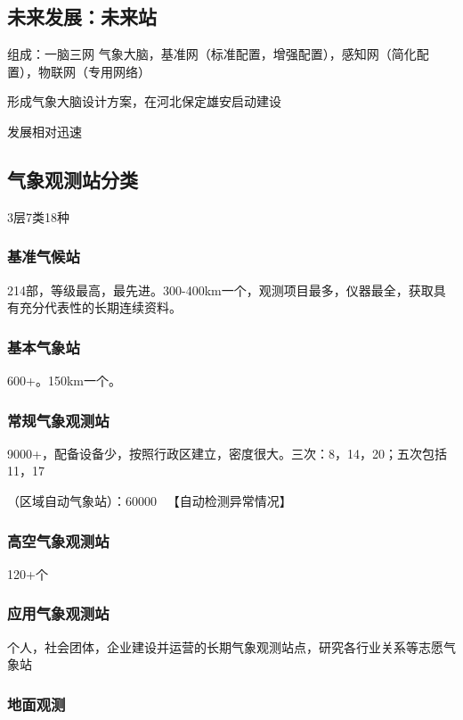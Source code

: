 ﻿\documentclass[UTF8,11pt]{ctexbook}%
\begin{document}
\subsection{未来发展：未来站}

组成：一脑三网 气象大脑，基准网（标准配置，增强配置），感知网（简化配置），物联网（专用网络）

形成气象大脑设计方案，在河北保定雄安启动建设

发展相对迅速

\subsection{气象观测站分类}

3层7类18种

\subsubsection{基准气候站}

214部，等级最高，最先进。300-400km一个，观测项目最多，仪器最全，获取具有充分代表性的长期连续资料。

\subsubsection{基本气象站}

600+。150km一个。

\subsubsection{常规气象观测站}

9000+，配备设备少，按照行政区建立，密度很大。三次：8，14，20；五次包括11，17

（区域自动气象站）：60000~ 【自动检测异常情况】

\subsubsection{高空气象观测站}

120+个

\subsubsection{应用气象观测站}

个人，社会团体，企业建设并运营的长期气象观测站点，研究各行业关系等志愿气象站

\subsubsection{地面观测}
\end{document}
